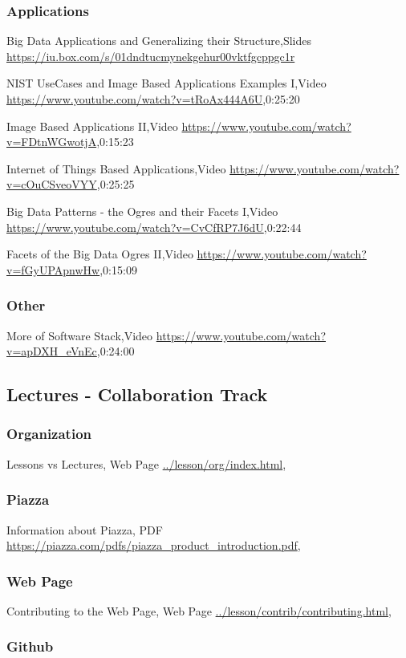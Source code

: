 \documentclass{article}
\begin{document}
\subsubsection{Applications}

Big Data Applications and Generalizing their Structure,Slides \url{https://iu.box.com/s/01dndtucmynekgehur00vktfgcppgc1r}

NIST UseCases and Image Based Applications Examples I,Video \url{https://www.youtube.com/watch?v=tRoAx444A6U},0:25:20

Image Based Applications II,Video \url{https://www.youtube.com/watch?v=FDtnWGwotjA},0:15:23

Internet of Things Based Applications,Video \url{https://www.youtube.com/watch?v=cOuCSveoVYY},0:25:25

Big Data Patterns - the Ogres and their Facets I,Video \url{https://www.youtube.com/watch?v=CvCfRP7J6dU},0:22:44

Facets of the Big Data Ogres II,Video \url{https://www.youtube.com/watch?v=fGyUPApnwHw},0:15:09

\subsubsection{Other}

More of Software Stack,Video \url{https://www.youtube.com/watch?v=apDXH_eVnEc},0:24:00

\subsection{Lectures - Collaboration Track}\label{lectures---collaboration-track}


\subsubsection{Organization}
 Lessons vs Lectures, Web Page \url{../lesson/org/index.html},
\subsubsection{Piazza}
 Information about Piazza, PDF \url{https://piazza.com/pdfs/piazza_product_introduction.pdf},
\subsubsection{Web Page}
 Contributing to the Web Page, Web Page \url{../lesson/contrib/contributing.html},


\subsubsection{Github}
 
\end{document}
